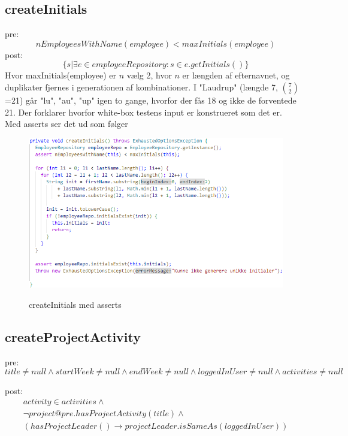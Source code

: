 \subsection{createInitials}
pre:
\begin{equation}
    nEmployeesWithName(employee) < maxInitials(employee)
\end{equation}
post:
\begin{equation}
    \{s | \exists e \in employeeRepository : s \in e.getInitials()\}
\end{equation}
Hvor maxInitials(employee) er $n$ vælg 2, hvor $n$ er længden af efternavnet, og duplikater fjernes i generationen af kombinationer.
I "Laudrup" (længde 7, $7 \choose 2$=21) går "lu", "au", "up" igen to gange, hvorfor der fås 18 og ikke de forventede 21. Der forklarer hvorfor white-box testens input er konstrueret som det er.\\[4mm]
Med asserts ser det ud som følger
\begin{figure}[H]
    \centering
    \caption{createInitials med asserts}
    \includegraphics[width = \textwidth, keepaspectratio]{ImplementationAndTest/Diagrams/contract_createInitials.png}
    \label{fig:contract_createInitials}
\end{figure}
\subsection{createProjectActivity}
pre: 
\begin{equation}
    title \neq null \wedge startWeek \neq null \wedge endWeek \neq null \wedge loggedInUser \neq null \wedge activities \neq null
\end{equation}

post: 
\begin{equation}
\begin{gathered}
    activity \in activities \wedge \\
    \neg project@pre.hasProjectActivity(title) \wedge \\
    (hasProjectLeader() \to projectLeader.isSameAs(loggedInUser))
\end{gathered}
\end{equation}

